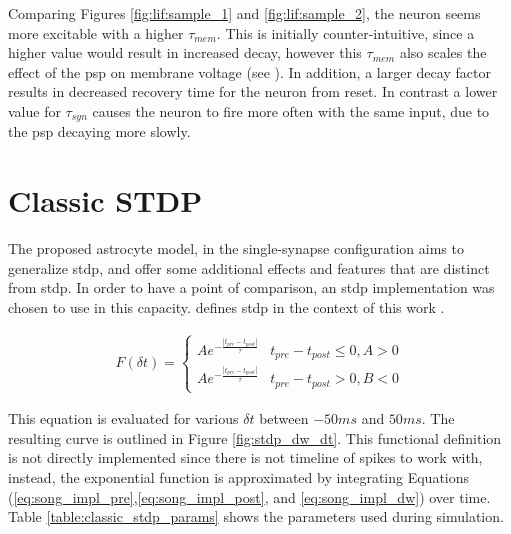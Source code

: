 

Comparing Figures \ref{fig:lif:sample_1} and \ref{fig:lif:sample_2}, the neuron
seems more excitable with a higher $\tau_{mem}$. This is initially
counter-intuitive, since a higher value would result in increased decay, however
this $\tau_{mem}$ also scales the effect of the \gls{psp} on membrane voltage
(see ). In addition, a larger decay factor results in decreased
recovery time for the neuron from reset. In contrast a lower value for
$\tau_{syn}$ causes the neuron to fire more often with the same input, due to
the \gls{psp} decaying more slowly.

\section{Classic STDP} \label{obj1:sec:classic_stdp}
    
The proposed astrocyte model, in the single-synapse configuration aims to
generalize \gls{stdp}, and offer some additional effects and features that are
distinct from \gls{stdp}. In order to have a point of comparison, an \gls{stdp}
implementation was chosen to use in this capacity. 
defines \gls{stdp} in the context of this work \parencite{song_2000}.

\begin{align}
  F(\delta t) =
  \begin{cases} 
    Ae^{- \frac{|t_{pre}-t_{post}|}{\tau}} & t_{pre} - t_{post} \leq 0, A > 0
    \\ Ae^{- \frac{|t_{pre}-t_{post}|}{\tau}} & t_{pre} - t_{post} > 0, B < 0
  \end{cases} \label{eq:song_classic_stdp}
\end{align}

This equation is evaluated for various $\delta t$ between $-50ms$ and
$50ms$. The resulting curve is outlined in Figure \ref{fig:stdp_dw_dt}. This
functional definition is not directly implemented since there is not timeline of
spikes to work with, instead, the exponential function is approximated by
integrating Equations
(\ref{eq:song_impl_pre},\ref{eq:song_impl_post}, and \ref{eq:song_impl_dw}) over
time. Table \ref{table:classic_stdp_params} shows the
parameters used during simulation.

